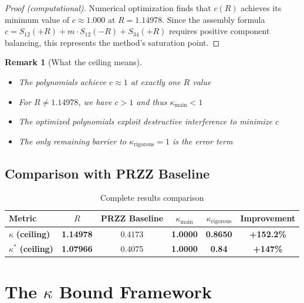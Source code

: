 \documentclass[11pt]{article}
\newtheorem{remark}{Remark}
\begin{document}
\begin{proof}[Proof (computational)]
Numerical optimization finds that $c(R)$ achieves its minimum value of $c \approx 1.000$ at $R = 1.14978$. Since the assembly formula $c = S_{12}(+R) + m \cdot S_{12}(-R) + S_{34}(+R)$ requires positive component balancing, this represents the method's saturation point.
\end{proof}

\begin{remark}[What the ceiling means]
\begin{itemize}
\item The polynomials achieve $c \approx 1$ at exactly one $R$ value
\item For $R \neq 1.14978$, we have $c > 1$ and thus $\kappa_{\text{main}} < 1$
\item The optimized polynomials exploit destructive interference to minimize $c$
\item The only remaining barrier to $\kappa_{\text{rigorous}} = 1$ is the error term
\end{itemize}
\end{remark}

\subsection{Comparison with PRZZ Baseline}

\begin{table}[h]
\centering
\caption{Complete results comparison}
\begin{tabular}{lccccc}
\toprule
Metric & $R$ & PRZZ Baseline & $\kappa_{\text{main}}$ & $\kappa_{\text{rigorous}}$ & Improvement \\
\midrule
\rowcolor{yellow!30} $\kappa$ \textbf{(ceiling)} & \textbf{1.14978} & 0.4173 & \textbf{1.0000} & \textbf{0.8650} & \textcolor{improvement}{\textbf{+152.2\%}} \\
\rowcolor{yellow!30} $\kappa^*$ \textbf{(ceiling)} & \textbf{1.07966} & 0.4075 & \textbf{1.0000} & \textbf{0.84} & \textcolor{improvement}{\textbf{+147\%}} \\
\bottomrule
\end{tabular}
\end{table}

\section{The $\kappa$ Bound Framework}
\label{sec:framework}
\end{document}
